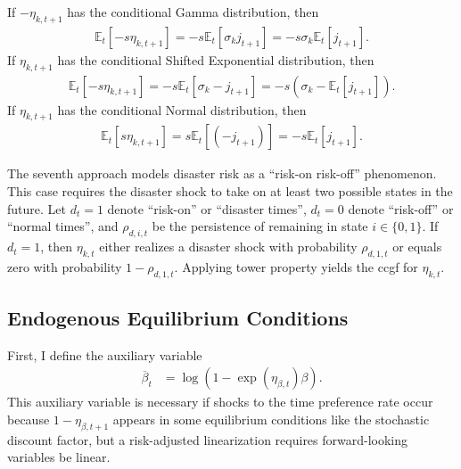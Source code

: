 \documentclass[12 pt, oneside]{article}
\theoremstyle{definition}
\theoremstyle{definition}
\theoremstyle{definition}
\newcommand{\E}{\mathbb{E}}
\begin{document}
If $-\eta_{k, t + 1}$ has the conditional Gamma distribution, then
\begin{align*}
\E_t[-s \eta_{k, t + 1}] = -s\E_t[\sigma_k j_{t + 1}] = -s\sigma_k \E_t[j_{t + 1}].
\end{align*}
If $\eta_{k, t + 1}$ has the conditional Shifted Exponential distribution, then
\begin{align*}
\E_t[-s \eta_{k, t + 1}] = -s \E_t[\sigma_k - j_{t + 1}] = -s(\sigma_k - \E_t[j_{t + 1}]).
\end{align*}
If $\eta_{k, t + 1}$ has the conditional Normal distribution, then
\begin{align*}
\E_t[s\eta_{k, t + 1}] = s \E_t[(-j_{t + 1})] = -s\E_t[j_{t + 1}].
\end{align*}


The seventh approach models disaster risk as a ``risk-on risk-off'' phenomenon. This case requires the disaster shock to take on at least two possible states in the future. Let $d_t = 1$ denote ``risk-on'' or ``disaster times'', $d_t = 0$ denote ``risk-off'' or ``normal times'', and  $\rho_{d, i, t}$ be the persistence of remaining in state $i \in \{0, 1\}$. If $d_t= 1$, then $\eta_{k, t}$ either realizes a disaster shock with probability $\rho_{d, 1, t}$ or equals zero with probability $1 - \rho_{d, 1, t}$. Applying tower property yields the ccgf for $\eta_{k, t}$.

\subsection{Endogenous Equilibrium Conditions}
First, I define the auxiliary variable
\begin{align}
  \overline{\beta}_t & = \log(1 - \exp(\eta_{\beta, t})\beta).
\end{align}
This auxiliary variable is necessary if shocks to the time preference rate occur because $1 - \eta_{\beta, t + 1}$ appears in some equilibrium conditions like the stochastic discount factor, but a risk-adjusted linearization requires forward-looking variables be linear.
\end{document}
